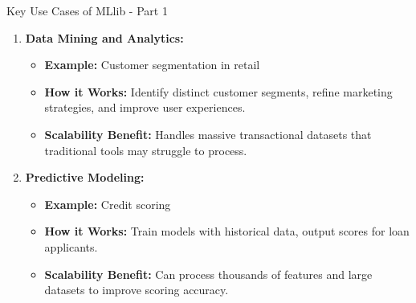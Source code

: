 \documentclass[aspectratio=169]{beamer}
\begin{document}
\begin{frame}[fragile]{Key Use Cases of MLlib - Part 1}
    \begin{enumerate}
        \item \textbf{Data Mining and Analytics:}
            \begin{itemize}
                \item \textbf{Example:} Customer segmentation in retail
                \item \textbf{How it Works:} Identify distinct customer segments, refine marketing strategies, and improve user experiences.
                \item \textbf{Scalability Benefit:} Handles massive transactional datasets that traditional tools may struggle to process.
            \end{itemize}
        \item \textbf{Predictive Modeling:}
            \begin{itemize}
                \item \textbf{Example:} Credit scoring
                \item \textbf{How it Works:} Train models with historical data, output scores for loan applicants.
                \item \textbf{Scalability Benefit:} Can process thousands of features and large datasets to improve scoring accuracy.
            \end{itemize}
    \end{enumerate}
\end{frame}
\end{document}
